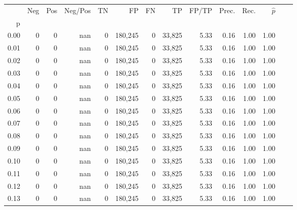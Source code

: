 \begin{tabular}{rrrrrrrrrrrrrr}
\toprule
{} &      Neg &     Pos & Neg/Pos &       TN &       FP &      FN &      TP & FP/TP & Prec. &  Rec. & $\hat{p}$ \\
p    &          &         &         &          &          &         &         &       &       &       &           \\
\midrule
0.00 &        0 &       0 &     nan &        0 &  180,245 &       0 &  33,825 &  5.33 &  0.16 &  1.00 &      1.00 \\
0.01 &        0 &       0 &     nan &        0 &  180,245 &       0 &  33,825 &  5.33 &  0.16 &  1.00 &      1.00 \\
0.02 &        0 &       0 &     nan &        0 &  180,245 &       0 &  33,825 &  5.33 &  0.16 &  1.00 &      1.00 \\
0.03 &        0 &       0 &     nan &        0 &  180,245 &       0 &  33,825 &  5.33 &  0.16 &  1.00 &      1.00 \\
0.04 &        0 &       0 &     nan &        0 &  180,245 &       0 &  33,825 &  5.33 &  0.16 &  1.00 &      1.00 \\
0.05 &        0 &       0 &     nan &        0 &  180,245 &       0 &  33,825 &  5.33 &  0.16 &  1.00 &      1.00 \\
0.06 &        0 &       0 &     nan &        0 &  180,245 &       0 &  33,825 &  5.33 &  0.16 &  1.00 &      1.00 \\
0.07 &        0 &       0 &     nan &        0 &  180,245 &       0 &  33,825 &  5.33 &  0.16 &  1.00 &      1.00 \\
0.08 &        0 &       0 &     nan &        0 &  180,245 &       0 &  33,825 &  5.33 &  0.16 &  1.00 &      1.00 \\
0.09 &        0 &       0 &     nan &        0 &  180,245 &       0 &  33,825 &  5.33 &  0.16 &  1.00 &      1.00 \\
0.10 &        0 &       0 &     nan &        0 &  180,245 &       0 &  33,825 &  5.33 &  0.16 &  1.00 &      1.00 \\
0.11 &        0 &       0 &     nan &        0 &  180,245 &       0 &  33,825 &  5.33 &  0.16 &  1.00 &      1.00 \\
0.12 &        0 &       0 &     nan &        0 &  180,245 &       0 &  33,825 &  5.33 &  0.16 &  1.00 &      1.00 \\
0.13 &        0 &       0 &     nan &        0 &  180,245 &       0 &  33,825 &  5.33 &  0.16 &  1.00 &      1.00 \\

\end{tabular}
